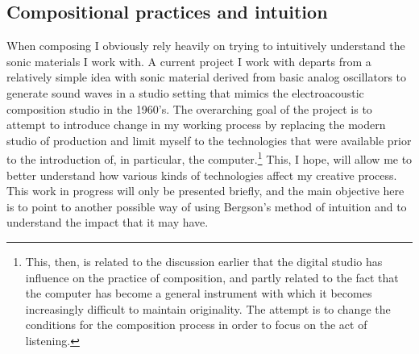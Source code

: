 \documentclass[11pt]{article}
\begin{document}
\subsection*{Compositional practices and intuition}
\label{sec:org3d2a727}
When composing I obviously rely heavily on trying to intuitively understand the sonic materials I work with.
A current project I work with departs from a relatively simple idea with sonic material derived from basic analog oscillators to generate sound waves in a studio setting that mimics the electroacoustic composition studio in the 1960's.
The overarching goal of the project is to attempt to introduce change in my working process by replacing the modern studio of production and limit myself to the technologies that were available prior to the introduction of, in particular, the computer.\footnote{This, then, is related to the discussion earlier that the digital studio has influence on the practice of composition, and partly related to the fact that the computer has become a general instrument with which it becomes increasingly difficult to maintain originality. The attempt is to change the conditions for the composition process in order to focus on the act of listening.}
This, I hope, will allow me to better understand how various kinds of technologies affect my creative process.
This work in progress will only be presented briefly, and the main objective here is to point to another possible way of using Bergson's method of intuition and to understand the impact that it may have.
\end{document}

